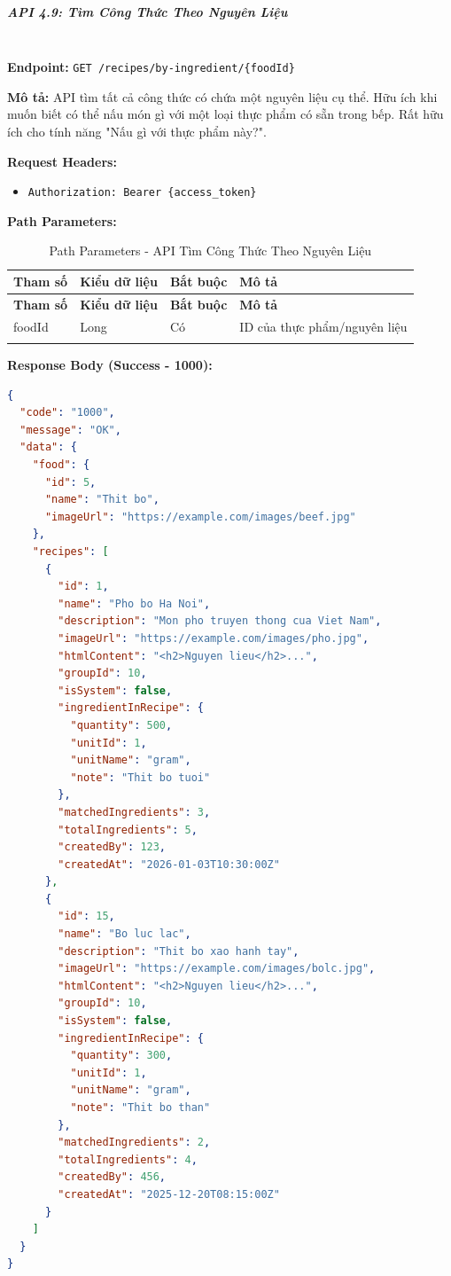 \normalsize

\subparagraph{API 4.9: Tìm Công Thức Theo Nguyên Liệu}~\\

\textbf{Endpoint:} \texttt{GET /recipes/by-ingredient/\{foodId\}}

\textbf{Mô tả:} API tìm tất cả công thức có chứa một nguyên liệu cụ thể. Hữu ích khi muốn biết có thể nấu món gì với một loại thực phẩm có sẵn trong bếp. Rất hữu ích cho tính năng "Nấu gì với thực phẩm này?".

\textbf{Request Headers:}
\begin{itemize}
    \item \texttt{Authorization: Bearer \{access\_token\}}
\end{itemize}

\textbf{Path Parameters:}

\small
\begin{longtable}{|>{\raggedright\arraybackslash}p{3cm}|>{\raggedright\arraybackslash}p{2.5cm}|>{\raggedright\arraybackslash}p{2cm}|>{\raggedright\arraybackslash}p{6cm}|}
\hline
\textbf{Tham số} & \textbf{Kiểu dữ liệu} & \textbf{Bắt buộc} & \textbf{Mô tả} \\
\hline
\endfirsthead
\hline
\textbf{Tham số} & \textbf{Kiểu dữ liệu} & \textbf{Bắt buộc} & \textbf{Mô tả} \\
\hline
\endhead
foodId & Long & Có & ID của thực phẩm/nguyên liệu \\
\hline
\caption{Path Parameters - API Tìm Công Thức Theo Nguyên Liệu}
\end{longtable}

\textbf{Response Body (Success - 1000):}

\begin{lstlisting}[language=json, caption=Response thanh cong API 4.9]
{
  "code": "1000",
  "message": "OK",
  "data": {
    "food": {
      "id": 5,
      "name": "Thit bo",
      "imageUrl": "https://example.com/images/beef.jpg"
    },
    "recipes": [
      {
        "id": 1,
        "name": "Pho bo Ha Noi",
        "description": "Mon pho truyen thong cua Viet Nam",
        "imageUrl": "https://example.com/images/pho.jpg",
        "htmlContent": "<h2>Nguyen lieu</h2>...",
        "groupId": 10,
        "isSystem": false,
        "ingredientInRecipe": {
          "quantity": 500,
          "unitId": 1,
          "unitName": "gram",
          "note": "Thit bo tuoi"
        },
        "matchedIngredients": 3,
        "totalIngredients": 5,
        "createdBy": 123,
        "createdAt": "2026-01-03T10:30:00Z"
      },
      {
        "id": 15,
        "name": "Bo luc lac",
        "description": "Thit bo xao hanh tay",
        "imageUrl": "https://example.com/images/bolc.jpg",
        "htmlContent": "<h2>Nguyen lieu</h2>...",
        "groupId": 10,
        "isSystem": false,
        "ingredientInRecipe": {
          "quantity": 300,
          "unitId": 1,
          "unitName": "gram",
          "note": "Thit bo than"
        },
        "matchedIngredients": 2,
        "totalIngredients": 4,
        "createdBy": 456,
        "createdAt": "2025-12-20T08:15:00Z"
      }
    ]
  }
}
\end{lstlisting}

